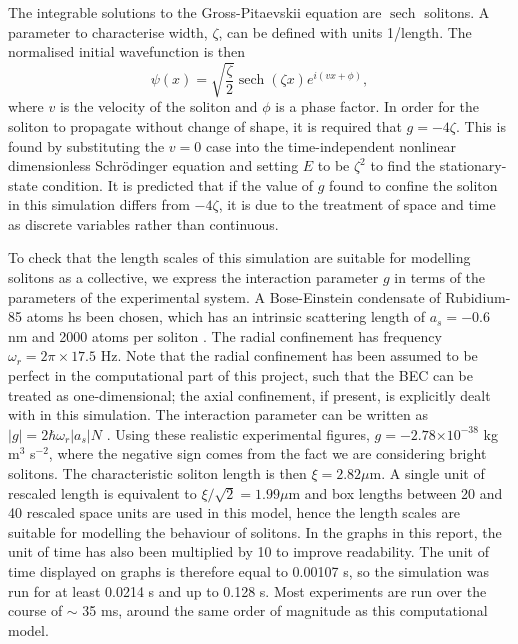 \documentclass[10pt, twocolumn]{revtex4}    %
\DeclareMathOperator{\sech}{sech}		%
\providecommand{\e}[1]{\ensuremath{\times 10^{#1}}} %
\begin{document}
The integrable solutions to the Gross-Pitaevskii equation are $\sech$ solitons. A parameter to characterise width, $\zeta$, can be defined with units 1/length. The normalised initial wavefunction is then 
\begin{equation} \label{soliton}
\psi(x) = \sqrt{\frac{\zeta}{2}} \sech{(\zeta x)} e^{i (v x + \phi)},
\end{equation}
where $v$ is the velocity of the soliton and $\phi$ is a phase factor. In order for the soliton to propagate without change of shape, it is required that $g=-4\zeta$. This is found by substituting the $v=0$ case into the time-independent nonlinear dimensionless Schr\"{o}dinger equation and setting $E$ to be $\zeta^2$ to find the stationary-state condition. It is predicted that if the value of $g$ found to confine the soliton in this simulation differs from $-4\zeta$, it is due to the treatment of space and time as discrete variables rather than continuous. 

To check that the length scales of this simulation are suitable for modelling solitons as a collective, we express the interaction parameter $g$ in terms of the parameters of the experimental system. A Bose-Einstein condensate of Rubidium-85 atoms hs been chosen, which has an intrinsic scattering length of $a_s = -0.6$ nm and 2000 atoms per soliton \cite{ExpParams}. The radial confinement has frequency $\omega_r = 2\pi \times 17.5$ Hz. Note that the radial confinement has been assumed to be perfect in the computational part of this project, such that the BEC can be treated as one-dimensional; the axial confinement, if present, is explicitly dealt with in this simulation. The interaction parameter can be written as $|g| = 2\hbar \omega_r |a_s| N$ \cite{Cornish}. Using these realistic experimental figures, $g = -2.78 \e{-38}$ kg m$^3$ s$^{-2}$, where the negative sign comes from the fact we are considering bright solitons. The characteristic soliton length is then $\xi = 2.82 \mu$m. A single unit of rescaled length is equivalent to $\xi/\sqrt{2} = 1.99 \mu$m and box lengths between 20 and 40 rescaled space units are used in this model, hence the length scales are suitable for modelling the behaviour of solitons. In the graphs in this report, the unit of time has also been multiplied by 10 to improve readability. The unit of time displayed on graphs is therefore equal to 0.00107 s, so the simulation was run for at least 0.0214 s and up to 0.128 s. Most experiments are run over the course of $\sim$ 35 ms, around the same order of magnitude as this computational model. 
\end{document}
